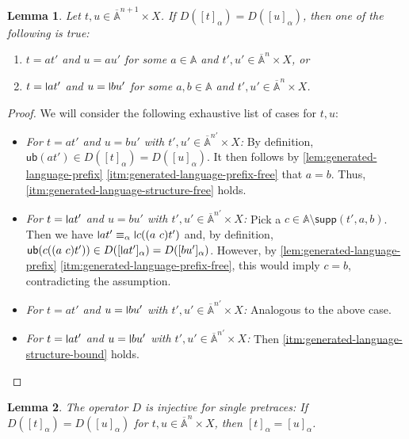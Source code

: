 \documentclass[11pt,a4paper]{amsart}
\newtheorem{lemma}[lemma]{Lemma}
\newcommand{\Names}{\mathbb{A}}
\newcommand{\barNames}{\overline{\Names}}
\newcommand{\alphaeq}{\equiv_\alpha}
\newcommand{\supp}{\mathsf{supp}}
\theoremstyle{plain}
\newcommand{\midmid}{\hspace{0.2ex}{\rule[-0.1ex]{0.6pt}{1.65ex}}\hspace{0.2ex}}
\newcommand{\newletter}[1]{{\midmid}#1}
\newcommand{\ub}{\mathsf{ub}}
\numberwithin{equation}{section}
\newcommand{\+}[1]{\mathcal{#1}\xspace}
\theoremstyle{definition}
\begin{document}
\begin{lemma}\label{lem:generated-language-structure}
  Let \(t, u \in \barNames^{n + 1} \times X\).
  If \(D([t]_\alpha) = D([u]_\alpha)\), then one of the following is true:
  \begin{enumerate}
    \item \label{itm:generated-language-structure-free}
      \(t = at'\) and \(u = au'\) for some \(a \in \Names\) and \(t', u' \in \barNames^n \times X\), or
    \item \label{itm:generated-language-structure-bound}
      \(t = \newletter{a}t'\) and \(u = \newletter{b}u'\) for some \(a, b \in \Names\) and \(t', u' \in \barNames^n \times X\).
  \end{enumerate}
\end{lemma}

\begin{proof}
  We will consider the following exhaustive list of cases for \(t, u\):
  \begin{itemize}
    \item \emph{For \(t = at'\) and \(u = bu'\) with \(t', u' \in \barNames^{n'} \times X\):}
      By definition, \(\ub(at') \in D([t]_\alpha) = D([u]_\alpha)\).
      It then follows by \cref{lem:generated-language-prefix} \eqref{itm:generated-language-prefix-free} that \(a = b\).
      Thus, \eqref{itm:generated-language-structure-free} holds.
    \item \textit{For \(t = \newletter{a}t'\) and \(u = bu'\) with \(t', u' \in \barNames^{n'} \times X\):}
      Pick a \(c \in \Names \setminus \supp(t', a, b)\).
      Then we have \(\newletter{a}t' \alphaeq \newletter{c} ((a\ c)t')\) and, by definition, \(\ub(c((a\ c)t')) \in D([\newletter{a}t']_\alpha) = D([bu']_\alpha)\).
      However, by \cref{lem:generated-language-prefix} \eqref{itm:generated-language-prefix-free}, this would imply \(c = b\), contradicting the assumption.
    \item \textit{For \(t = at'\) and \(u = \newletter{b}u'\) with \(t', u' \in \barNames^{n'} \times X\):}
      Analogous to the above case.
    \item \textit{For \(t = \newletter{a}t'\) and \(u = \newletter{b}u'\) with \(t', u' \in \barNames^{n'} \times X\):}
      Then \eqref{itm:generated-language-structure-bound} holds.
  \end{itemize}
\end{proof}

\begin{lemma}\label{lem:generated-language-injectivity}
  The operator \(D\) is injective for single pretraces: If \(D([t]_\alpha) = D([u]_\alpha)\) for \(t, u \in \barNames^n \times X\), then \([t]_\alpha = [u]_\alpha\).
\end{lemma}
\end{document}
